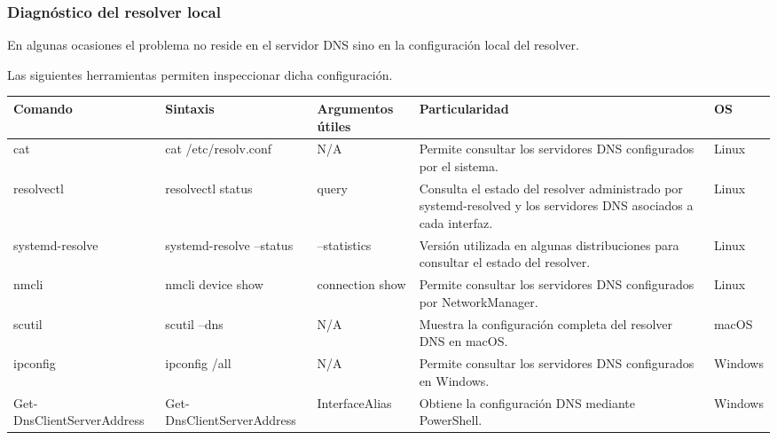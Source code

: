 \documentclass[a4paper,10pt]{article}
\begin{document}

\subsubsection{Diagnóstico del resolver local}

En algunas ocasiones el problema no reside en el servidor DNS sino en la
configuración local del resolver.

Las siguientes herramientas permiten inspeccionar dicha configuración.

\begin{longtable}{|p{2.8cm}|p{3cm}|p{4cm}|p{5.6cm}|p{1.5cm}|}

\hline
Comando &
Sintaxis &
Argumentos útiles &
Particularidad &
OS
\\
\hline
\endhead

cat &
cat /etc/resolv.conf &
N/A &
Permite consultar los servidores DNS configurados por el sistema. &
Linux
\\
\hline

resolvectl &
resolvectl status &
query &
Consulta el estado del resolver administrado por systemd-resolved y los servidores DNS asociados a cada interfaz. &
Linux
\\
\hline

systemd-resolve &
systemd-resolve --status &
--statistics &
Versión utilizada en algunas distribuciones para consultar el estado del resolver. &
Linux
\\
\hline

nmcli &
nmcli device show &
connection show &
Permite consultar los servidores DNS configurados por NetworkManager. &
Linux
\\
\hline

scutil &
scutil --dns &
N/A &
Muestra la configuración completa del resolver DNS en macOS. &
macOS
\\
\hline

ipconfig &
ipconfig /all &
N/A &
Permite consultar los servidores DNS configurados en Windows. &
Windows
\\
\hline

Get-DnsClientServerAddress &
Get-DnsClientServerAddress &
InterfaceAlias &
Obtiene la configuración DNS mediante PowerShell. &
Windows
\\
\hline

\end{longtable}

\end{document}
